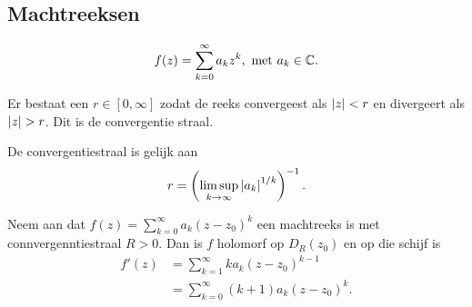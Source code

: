 \subsection{Machtreeksen} \label{sec:machtreeksen}
\[
	f(z) = \sum_{k=0}^{\infty} a_k z^{k}, \text{ met } a_k \in \mathbb{C}
.\] 
\begin{definitie}
	Er bestaat een $r \in [0, \infty]$ zodat de reeks convergeest als  $\left| z \right| < r$ en divergeert als  $\left| z \right| > r$. Dit is de convergentie straal.
\end{definitie}
\begin{stelling}
	De convergentiestraal is gelijk aan \[
		r = \left( \limsup_{k \to \infty} \left| a_k \right|^{1 / k} \right) ^{-1}
	.\] 
\end{stelling}
 \begin{stelling}
	 Neem aan dat $f(z) = \sum_{k = 0}^{\infty} a_k(z - z_0)^{k}$ een machtreeks is met connvergenntiestraal $R > 0$. Dan is $f$ holomorf op  $D_R(z_0)$ en op die schijf is \begin{align*}
		 f'(z) &= \sum_{k = 1}^{\infty} k a_k(z-z_0)^{k-1}\\
		       &= \sum_{k = 0}^{\infty} (k+1)a_k (z-z_0)^{k} 
	 .\end{align*} 
 \end{stelling}
